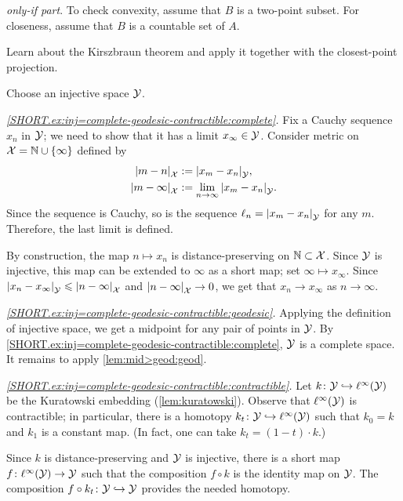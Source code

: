 \parbf{\ref{ex:conv-short};} \textit{only-if part}.
To check convexity, assume that $B$ is a two-point subset.
For closeness, assume that $B$ is a countable set of $A$.

Learn about the Kirszbraun theorem and apply it together with the closest-point projection.

\setcounter{eqtn}{0}


Choose an injective space $\mathcal{Y}$.

\textit{\ref{SHORT.ex:inj=complete-geodesic-contractible:complete}.}
Fix a Cauchy sequence $x_n$ in $\mathcal{Y}$;
we need to show that it has a limit $x_\infty\in \mathcal{Y}$.
Consider metric on $\mathcal{X}=\mathbb{N}\cup\{\infty\}$ defined by 
\begin{align*}
\dist{m}{n}{\spc{X}}&\df\dist{x_m}{x_n}{\spc{Y}},
\\
\dist{m}{\infty}{\spc{X}}&\df\lim_{n\to\infty}\dist{x_m}{x_n}{\spc{Y}}.
\end{align*}
Since the sequence is Cauchy, so is the sequence $\ell_n=\dist{x_m}{x_n}{\spc{Y}}$ for any $m$.
Therefore, the last limit is defined.

By construction, the map $n\mapsto x_n$ is distance-preserving on $\mathbb{N}\subset \mathcal{X}$.
Since $\mathcal{Y}$ is injective, this map can be extended to $\infty$ as a short map; set $\infty\mapsto x_\infty$.
Since $\dist{x_n}{x_\infty}{\spc{Y}}\le \dist{n}{\infty}{\spc{X}}$ 
and $\dist{n}{\infty}{\spc{X}}\to 0$, we get that
$x_n\to x_\infty$ as $n\to\infty$.

\textit{\ref{SHORT.ex:inj=complete-geodesic-contractible:geodesic}.}
Applying the definition of injective space, we get a midpoint for any pair of points in $\mathcal{Y}$.
By \ref{SHORT.ex:inj=complete-geodesic-contractible:complete},
$\mathcal{Y}$ is a complete space.
It remains to apply \ref{lem:mid>geod:geod}.

\textit{\ref{SHORT.ex:inj=complete-geodesic-contractible:contractible}.}
Let $k\colon\mathcal{Y}\hookrightarrow \ell^\infty(\mathcal{Y})$ be the Kuratowski embedding (\ref{lem:kuratowski}).
Observe that $\ell^\infty(\mathcal{Y})$ is contractible;
in particular, there is a homotopy $k_t\colon\mathcal{Y}\hookrightarrow \ell^\infty(\mathcal{Y})$ such that $k_0=k$ and $k_1$ is a constant map.
(In fact, one can take $k_t=(1-t)\cdot k$.)

Since $k$ is distance-preserving and $\mathcal{Y}$ is injective,
there is a short map $f\colon\ell^\infty(\mathcal{Y})\to \mathcal{Y}$ such that the composition $f\circ k$ is the identity map on $\mathcal{Y}$.
The composition $f\circ k_t\colon\mathcal{Y}\hookrightarrow \mathcal{Y}$ provides the needed homotopy. 

